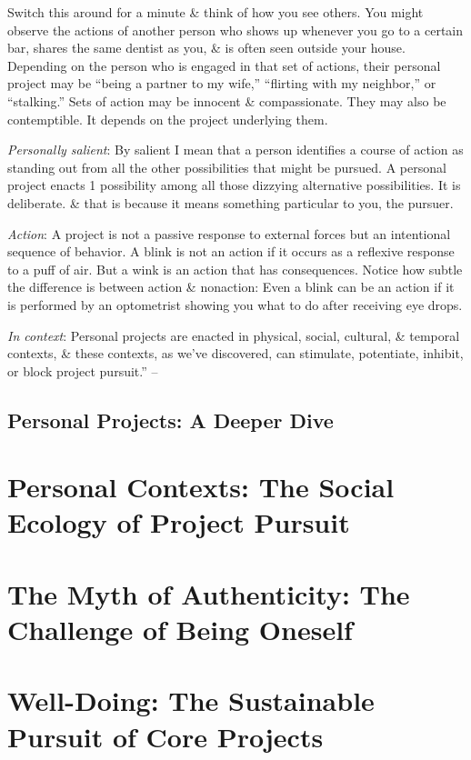 \documentclass{article}
\numberwithin{equation}{section}
\begin{document}
Switch this around for a minute \& think of how you see others. You might observe the actions of another person who shows up whenever you go to a certain bar, shares the same dentist as you, \& is often seen outside your house. Depending on the person who is engaged in that set of actions, their personal project may be ``being a partner to my wife,'' ``flirting with my neighbor,'' or ``stalking.'' Sets of action may be innocent \& compassionate. They may also be contemptible. It depends on the project underlying them.

\textit{Personally salient}: By salient I mean that a person identifies a course of action as standing out from all the other possibilities that might be pursued. A personal project enacts 1 possibility among all those dizzying alternative possibilities. It is deliberate. \& that is because it means something particular to you, the pursuer.

\textit{Action}: A project is not a passive response to external forces but an intentional sequence of behavior. A blink is not an action if it occurs as a reflexive response to a puff of air. But a wink is an action that has consequences. Notice how subtle the difference is between action \& nonaction: Even a blink can be an action if it is performed by an optometrist showing you what to do after receiving eye drops.

\textit{In context}: Personal projects are enacted in physical, social, cultural, \& temporal contexts, \& these contexts, as we've discovered, can stimulate, potentiate, inhibit, or block project pursuit.'' -- \cite[pp. 27--31]{Little2017}

\subsection{Personal Projects: A Deeper Dive}


\section{Personal Contexts: The Social Ecology of Project Pursuit}


\section{The Myth of Authenticity: The Challenge of Being Oneself}


\section{Well-Doing: The Sustainable Pursuit of Core Projects}


\printbibliography[heading=bibintoc]
	
\end{document}
